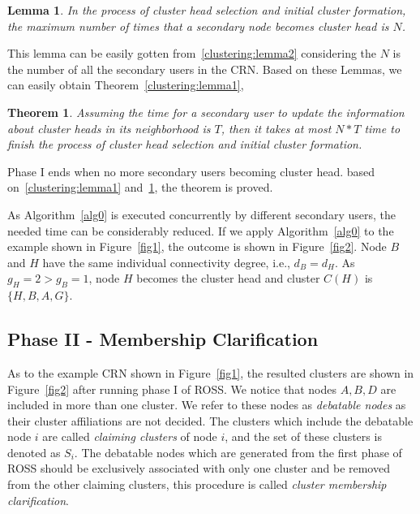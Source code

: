 \documentclass[times]{ettauth}
\theoremstyle{mytheoremstyle}
\newtheorem{theorem}{Theorem}[section]
\theoremstyle{mytheoremstyle}
\theoremstyle{mytheoremstyle}
\newtheorem{lemma}{Lemma}[section]
\begin{document}
%

\begin{lemma}
\label{clustering:lemma3}
In the process of cluster head selection and initial cluster formation, the maximum number of times that a secondary node becomes cluster head is $N$.
\end{lemma}
This lemma can be easily gotten from~\ref{clustering:lemma2} considering the $N$ is the number of all the secondary users in the CRN.
Based on these Lemmas, we can easily obtain Theorem~\ref{clustering:lemma1},
\begin{theorem}
\label{clustering:theorem}
Assuming the time for a secondary user to update the information about cluster heads in its neighborhood is $T$, then it takes at most $N*T $ time to finish the process of cluster head selection and initial cluster formation.
\end{theorem}
Phase I ends when no more secondary users becoming cluster head.
based on~\ref{clustering:lemma1} and~\ref{clustering:lemma3}, the theorem is proved.


As Algorithm~\ref{alg0} is executed concurrently by different secondary users, the needed time can be considerably reduced.
If we apply Algorithm~\ref{alg0} to the example shown in Figure~\ref{fig1}, the outcome is shown in Figure~\ref{fig2}.
Node $B$ and $H$ have the same individual connectivity degree, i.e., $d_B=d_H$. As $g_H=2>g_B=1$, node $H$ becomes the cluster head and cluster $C(H)$ is $\{H, B, A, G\}$.


\subsection{Phase II - Membership Clarification}
\label{membershipClarification}
As to the example CRN shown in Figure~\ref{fig1}, the resulted clusters are shown in Figure~\ref{fig2} after running phase I of ROSS.
We notice that nodes $A, B, D$ are included in more than one cluster. 
We refer to these nodes as \textit{debatable nodes} as their cluster affiliations are not decided.
The clusters which include the debatable node $i$ are called \textit{claiming clusters} of node $i$, and the set of these clusters is denoted as $S_i$.  
The debatable nodes which are generated from the first phase of ROSS should be exclusively associated with only one cluster and be removed from the other claiming clusters, this procedure is called \textit{cluster membership clarification}.
\end{document}
